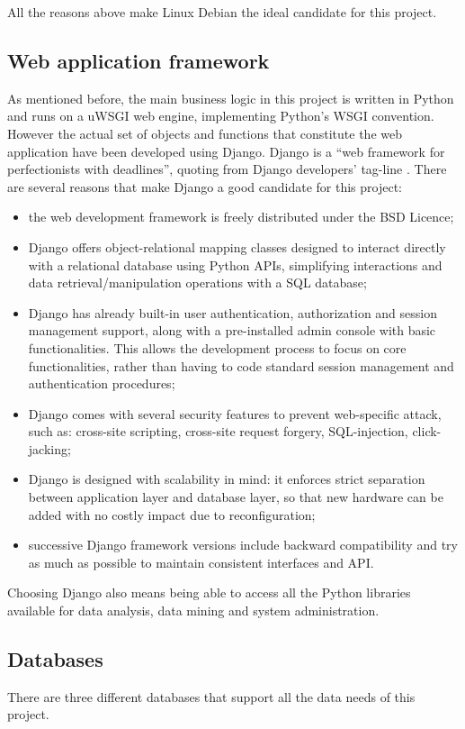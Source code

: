 All the reasons above make Linux Debian the ideal candidate for this project.

\subsection{Web application framework}

As mentioned before, the main business logic in this project is written in
Python and runs on a uWSGI web engine, implementing Python's WSGI convention.
However the actual set of objects and functions that constitute the web application have been developed using Django.
Django is a ``web framework for perfectionists with deadlines'', quoting from
Django developers' tag-line \cite{Django}. There are several reasons that make
Django a good candidate for this project:
\begin{itemize}
  \item the web development framework is freely distributed under the BSD
  Licence;
  \item Django offers object-relational mapping classes designed to interact
  directly with a relational database using Python APIs, simplifying
  interactions and data retrieval/manipulation operations with a SQL
  database;
  \item Django has already built-in user authentication, authorization and
  session management support, along with a pre-installed admin console with basic
  functionalities. This allows the development process to focus on core
  functionalities, rather than having to code standard session management and
  authentication procedures;
  \item Django comes with several security features to prevent web-specific
  attack, such as: cross-site scripting, cross-site request forgery,
  SQL-injection, click-jacking;
  \item Django is designed with scalability in mind: it enforces strict
  separation between application layer and database layer, so that new hardware
  can be added with no costly impact due to reconfiguration;
  \item successive Django framework versions include backward compatibility and
  try as much as possible to maintain consistent interfaces and API.
\end{itemize}

Choosing Django also means being able to access all the Python libraries
available for data analysis, data mining and system administration.

\subsection{Databases}
There are three different databases that support all the data needs of this
project.

